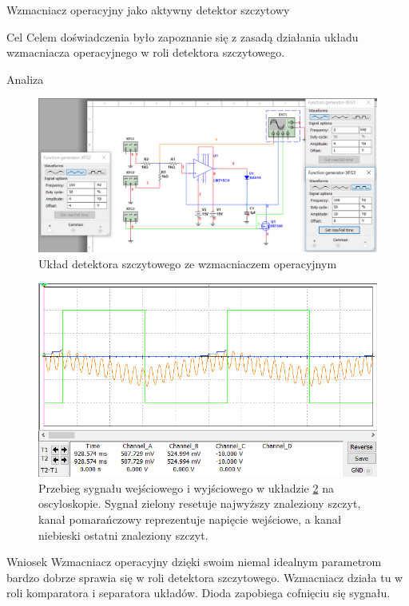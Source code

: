 \documentclass[a4paper]{scrartcl}
\begin{document}
	\begin{section}{Wzmacniacz operacyjny jako aktywny detektor szczytowy}
		\begin{subsection}{Cel}
			Celem doświadczenia było zapoznanie się z zasadą działania układu wzmacniacza operacyjnego w roli detektora szczytowego.
		\end{subsection}
		\begin{subsection}{Analiza}
				\begin{figure}[ht]
				\begin{center}
					\includegraphics[width=\linewidth]{08-circuit-2}
					\caption{Układ detektora szczytowego ze wzmacniaczem operacyjnym}
					\label{fig:circuit-8}
				\end{center}
				\end{figure}
				\begin{figure}[!ht]
				\begin{center}
					\includegraphics[width=0.6\linewidth]{08-osc-2}
					\caption{Przebieg sygnału wejściowego i wyjściowego w układzie \ref{fig:circuit-8} na oscyloskopie. Sygnał zielony resetuje najwyższy znaleziony szczyt, kanał pomarańczowy reprezentuje napięcie wejściowe, a kanał niebieski ostatni znaleziony szczyt.}
					\label{fig:circuit-8}
				\end{center}
				\end{figure}
		\end{subsection}
		\begin{subsection}{Wniosek}
			Wzmacniacz operacyjny dzięki swoim niemal idealnym parametrom bardzo dobrze sprawia się w roli detektora szczytowego. Wzmacniacz działa tu w roli komparatora i separatora układów. Dioda zapobiega cofnięciu się sygnału.	
		\end{subsection}
	\end{section}
\end{document}
